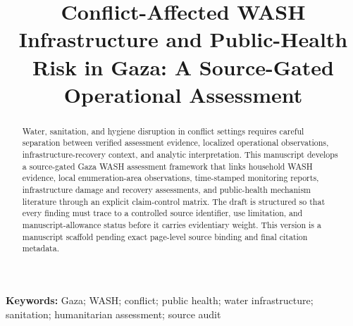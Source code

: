 \documentclass[12pt]{article}
\title{Conflict-Affected WASH Infrastructure and Public-Health Risk in Gaza: A Source-Gated Operational Assessment}
\author{}
\date{}
\begin{document}
\maketitle

\begin{abstract}
Water, sanitation, and hygiene disruption in conflict settings requires careful separation between verified assessment evidence, localized operational observations, infrastructure-recovery context, and analytic interpretation. This manuscript develops a source-gated Gaza WASH assessment framework that links household WASH evidence, local enumeration-area observations, time-stamped monitoring reports, infrastructure damage and recovery assessments, and public-health mechanism literature through an explicit claim-control matrix. The draft is structured so that every finding must trace to a controlled source identifier, use limitation, and manuscript-allowance status before it carries evidentiary weight. This version is a manuscript scaffold pending exact page-level source binding and final citation metadata.
\end{abstract}

\noindent\textbf{Keywords:} Gaza; WASH; conflict; public health; water infrastructure; sanitation; humanitarian assessment; source audit








\end{document}
